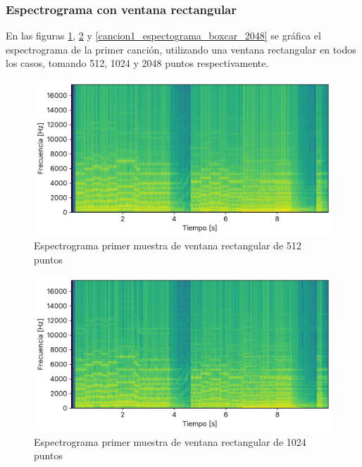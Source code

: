 \documentclass[12pt]{article}
\begin{document}
\hypertarget{espectograma-ventana-rectangular}{%
\subsubsection{Espectrograma con ventana rectangular}\label{espectograma-ventana-rectangular}}

En las figuras \ref{cancion1_espectograma_boxcar_0512}, \ref{cancion1_espectograma_boxcar_1024} y \ref{cancion1_espectograma_boxcar_2048} se gráfica el espectrograma de la primer canción, utilizando una ventana rectangular en todos los casos, tomando 512, 1024 y 2048 puntos respectivamente.

\begin{figure}[H]
\centering
\includegraphics{plot/cancion1_espectograma_boxcar_0512.png}
\caption{Espectrograma primer muestra de ventana rectangular de 512 puntos}
\label{cancion1_espectograma_boxcar_0512}
\end{figure}

\begin{figure}[H]
\centering
\includegraphics{plot/cancion1_espectograma_boxcar_1024.png}
\caption{Espectrograma primer muestra de ventana rectangular de 1024 puntos}
\label{cancion1_espectograma_boxcar_1024}
\end{figure}
\end{document}
